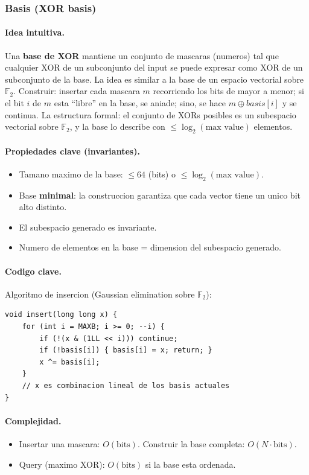 ﻿\subsubsection{Basis (XOR basis)}

\paragraph{Idea intuitiva.}
Una \textbf{base de XOR} mantiene un conjunto de mascaras (numeros) tal que cualquier XOR de un subconjunto del input se puede expresar como XOR de un subconjunto de la base. La idea es similar a la base de un espacio vectorial sobre $\mathbb{F}_2$. Construir: insertar cada mascara $m$ recorriendo los bits de mayor a menor; si el bit $i$ de $m$ esta ``libre'' en la base, se aniade; sino, se hace $m \oplus basis[i]$ y se continua. La estructura formal: el conjunto de XORs posibles es un subespacio vectorial sobre $\mathbb{F}_2$, y la base lo describe con $\le \log_2(\text{max value})$ elementos.

\paragraph{Propiedades clave (invariantes).}
\begin{itemize}\setlength\itemsep{0pt}
	\item Tamano maximo de la base: $\le 64$ (bits) o $\le \log_2(\text{max value})$.
	\item Base \textbf{minimal}: la construccion garantiza que cada vector tiene un unico bit alto distinto.
	\item El subespacio generado es invariante.
	\item Numero de elementos en la base = dimension del subespacio generado.
\end{itemize}

\paragraph{Codigo clave.}
Algoritmo de insercion (Gaussian elimination sobre $\mathbb{F}_2$):
\begin{verbatim}
void insert(long long x) {
    for (int i = MAXB; i >= 0; --i) {
        if (!(x & (1LL << i))) continue;
        if (!basis[i]) { basis[i] = x; return; }
        x ^= basis[i];
    }
    // x es combinacion lineal de los basis actuales
}
\end{verbatim}

\paragraph{Complejidad.}
\begin{itemize}\setlength\itemsep{0pt}
	\item Insertar una mascara: $O(\text{bits})$. Construir la base completa: $O(N \cdot \text{bits})$.
	\item Query (maximo XOR): $O(\text{bits})$ si la base esta ordenada.
\end{itemize}

